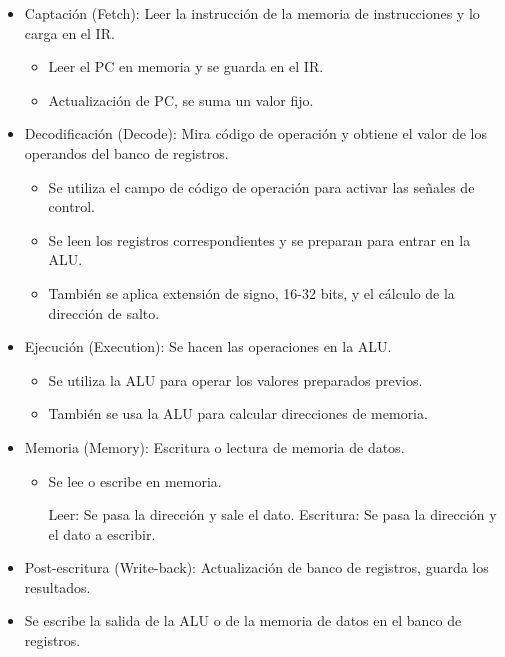 \documentclass[12pt, twoside, openright]{report} %
\begin{document}
\begin{itemize}
\begin{itemize}
    \item
      Captación (Fetch): Leer la instrucción de la memoria de
      instrucciones y lo carga en el IR.

      \begin{itemize}
      
      \item
        Leer el PC en memoria y se guarda en el IR.
      \item
        Actualización de PC, se suma un valor fijo.
      \end{itemize}
    \item
      Decodificación (Decode): Mira código de operación y obtiene el
      valor de los operandos del banco de registros.

      \begin{itemize}
      
      \item
        Se utiliza el campo de código de operación para activar las
        señales de control.
      \item
        Se leen los registros correspondientes y se preparan para entrar
        en la ALU.
      \item
        También se aplica extensión de signo, 16-32 bits, y el cálculo
        de la dirección de salto.
      \end{itemize}
    \item
      Ejecución (Execution): Se hacen las operaciones en la ALU.

      \begin{itemize}
      
      \item
        Se utiliza la ALU para operar los valores preparados previos.
      \item
        También se usa la ALU para calcular direcciones de memoria.
      \end{itemize}
    \item
      Memoria (Memory): Escritura o lectura de memoria de datos.

      \begin{itemize}
      
      \item
        Se lee o escribe en memoria.

        
          Leer: Se pasa la dirección y sale el dato.
          Escritura: Se pasa la dirección y el dato a escribir.
      \end{itemize}
    \item
      Post-escritura (Write-back): Actualización de banco de registros,
      guarda los resultados.
    \item
      Se escribe la salida de la ALU o de la memoria de datos en el
      banco de registros.
    \end{itemize}
  \end{itemize}
\end{document}
